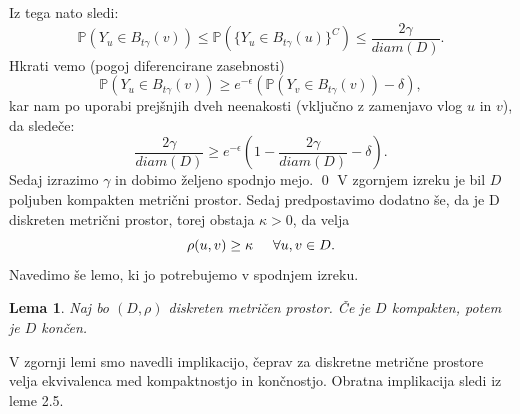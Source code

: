 \documentclass[12pt,a4paper]{amsart}
\theoremstyle{definition} %
\theoremstyle{plain} %
\newtheorem{lema}[definicija]{Lema}
\begin{document}
Iz tega nato sledi: $$\mathbb{P}(Y_u \in B_{t\gamma}(v)) \leq \mathbb{P}(\{Y_u \in B_{t\gamma}(u)\}^C) \leq \frac{2\gamma}{diam(D)}.$$ Hkrati vemo (pogoj diferencirane zasebnosti) $$\mathbb{P}(Y_u \in B_{t\gamma}(v)) \geq e^{-\epsilon}(\mathbb{P}(Y_v \in B_{t\gamma}(v)) - \delta),$$ kar nam po uporabi prejšnjih dveh neenakosti (vključno z zamenjavo vlog $u$ in $v$), da sledeče: $$\frac{2\gamma}{diam(D)} \geq e^{-\epsilon}(1 - \frac{2\gamma}{diam(D)} - \delta). $$ Sedaj izrazimo $\gamma$ in dobimo željeno spodnjo mejo.
\qed
\newline
\newline
V zgornjem izreku je bil $D$ poljuben kompakten metrični prostor. Sedaj predpostavimo dodatno še, da je D diskreten metrični prostor, torej obstaja $\kappa > 0$, da velja $$\rho(u,v) \geq \kappa \hspace{0.5cm}  \forall u, v \in D.$$ Navedimo še lemo, ki jo potrebujemo v spodnjem izreku. 
\begin{lema}
 Naj bo $(D, \rho)$ diskreten metričen prostor. Če je $D$ kompakten, potem je $D$ končen. 
\end{lema}
V zgornji lemi smo navedli implikacijo, čeprav za diskretne metrične prostore velja ekvivalenca med kompaktnostjo in končnostjo. Obratna implikacija sledi iz leme 2.5.
\end{document}
